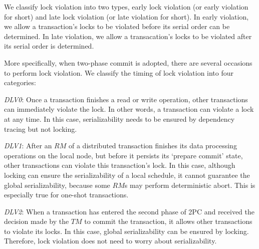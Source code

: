 \documentclass[conference]{IEEEtran}
\begin{document}
We classify lock violation into two types, early lock violation (or early violation for short) and late lock violation (or late violation for short).
In early violation,  we allow a transaction's locks to be violated before its serial order can be determined.
In late violation,  we allow a transacation's locks to be violated after its serial order is determined.


More specifically, when two-phase commit is adopted, there are several occasions to perform lock violation.
We classify the timing of lock violation into four categories:

\emph{DLV0}:
Once a transaction finishes a read or write operation, other transactions can immediately violate the lock.
In other words, a transaction can violate a lock at any time.
In this case, serializability needs to be ensured by dependency tracing but not locking.

\emph{DLV1}:
After an ${RM}$ of a distributed transaction finishes its data processing operations on the local node, but before it persists its `prepare commit' state, other transactions can violate this transaction's lock.
In this case, although locking can ensure the serializability of a local schedule, it cannot guarantee the global serializability, because some ${RM}$s may perform deterministic abort. 
This is especially true for one-shot transactions.

\emph{DLV2}:
When a transaction has entered the second phase of 2PC and received the decision made by the ${TM}$ to commit the transaction, it allows other transactions to violate its locks.
In this case, global serializability can be ensured by locking. Therefore, lock violation does not need to worry about serializability.
\end{document}
